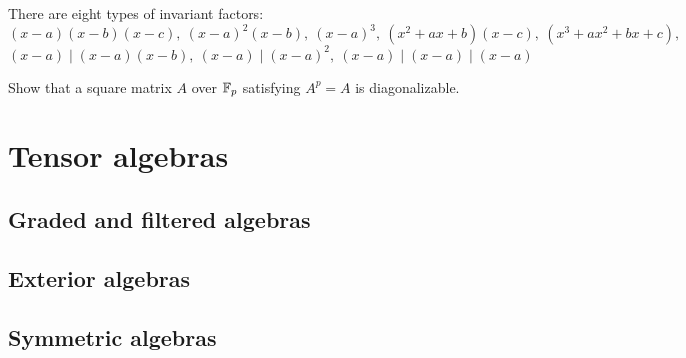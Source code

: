 \documentclass{../../large}
\begin{document}
\begin{prb}
There are eight types of invariant factors:
\[(x-a)(x-b)(x-c),\ (x-a)^2(x-b),\ (x-a)^3,\ (x^2+ax+b)(x-c),\ (x^3+ax^2+bx+c),\]
\[(x-a)\mid(x-a)(x-b),\ (x-a)\mid(x-a)^2,\ (x-a)\mid(x-a)\mid(x-a)\]
\end{prb}

Show that a square matrix $A$ over $\mathbb{F}_p$ satisfying $A^p=A$ is diagonalizable.



\chapter{Tensor algebras}
\section{Graded and filtered algebras}
\section{Exterior algebras}
\begin{prb}[Determinants]
\end{prb}
\section{Symmetric algebras}
\end{document}
